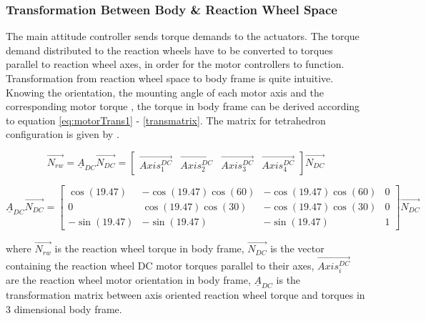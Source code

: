 
\subsubsection{Transformation Between Body \& Reaction Wheel Space}

The main attitude controller sends torque demands to the actuators. The torque demand distributed to the reaction wheels have to be converted to torques parallel to reaction wheel axes, in order for the motor controllers to function. Transformation from reaction wheel space to body frame is quite intuitive. Knowing the orientation, the mounting angle of each motor axis and the corresponding motor torque
, the torque in body frame can be derived according to equation \ref{eq:motorTrans1} - \ref{transmatrix}. The matrix for tetrahedron configuration is given by \cite{reactionWheelConfigThesis}.

\begin{equation}
\label{eq:motorTrans1}
\vec{N_{rw}} = \underline{A}_{DC} \vec{N_{DC}} = \begin{bmatrix}
\vec{Axis^{DC}_{1}}       & \vec{Axis^{DC}_{2}}   & \vec{Axis^{DC}_{3}}   & \vec{Axis^{DC}_{4}} 
\end{bmatrix} \vec{N_{DC}}
\end{equation}

\begin{equation}
\underline{A}_{DC} \vec{N_{DC}}  = 
\begin{bmatrix}
\cos(19.47)       & -\cos(19.47) \cos(60)  &  -\cos(19.47) \cos(60)  & 0 \\
0       & \cos(19.47) \cos(30)  &  -\cos(19.47) \cos(30)  & 0 \\
-\sin(19.47)       & -\sin(19.47)   &  -\sin(19.47)   & 1
\end{bmatrix} \vec{N_{DC}}
\label{transmatrix}
\end{equation}

where $\vec{N_{rw}}$ is the reaction wheel torque in body frame, $\vec{N_{DC}}$ is the vector containing the reaction wheel DC motor torques parallel to their axes, $\vec{Axis^{DC}_{i}}$ are the reaction wheel motor orientation in body frame, $\underline{A}_{DC}$ is the transformation matrix between axis oriented reaction wheel torque and torques in 3 dimensional body frame.




